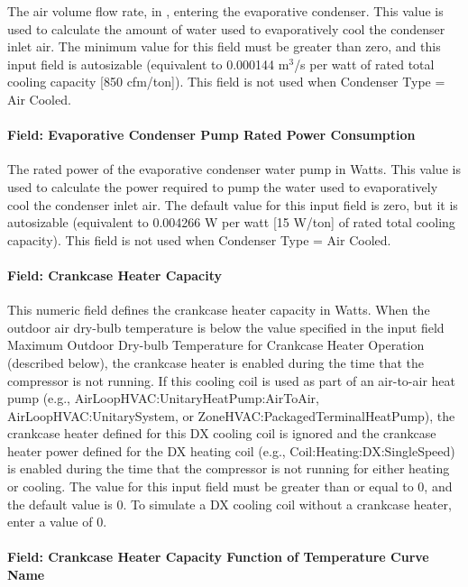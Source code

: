 The air volume flow rate, in \si{\volumeFlowRate}, entering the evaporative condenser. This value is used to calculate the amount of water used to evaporatively cool the condenser inlet air. The minimum value for this field must be greater than zero, and this input field is autosizable (equivalent to 0.000144 m\(^{3}\)/s per watt of rated total cooling capacity {[}850 cfm/ton{]}). This field is not used when Condenser Type = Air Cooled.

\paragraph{Field: Evaporative Condenser Pump Rated Power Consumption}\label{field-evaporative-condenser-pump-rated-power-consumption}

The rated power of the evaporative condenser water pump in Watts. This value is used to calculate the power required to pump the water used to evaporatively cool the condenser inlet air. The default value for this input field is zero, but it is autosizable (equivalent to 0.004266 W per watt {[}15 W/ton{]} of rated total cooling capacity). This field is not used when Condenser Type = Air Cooled.

\paragraph{Field: Crankcase Heater Capacity}\label{field-crankcase-heater-capacity}

This numeric field defines the crankcase heater capacity in Watts. When the outdoor air dry-bulb temperature is below the value specified in the input field Maximum Outdoor Dry-bulb Temperature for Crankcase Heater Operation (described below), the crankcase heater is enabled during the time that the compressor is not running. If this cooling coil is used as part of an air-to-air heat pump (e.g., AirLoopHVAC:UnitaryHeatPump:AirToAir, AirLoopHVAC:UnitarySystem, or ZoneHVAC:PackagedTerminalHeatPump), the crankcase heater defined for this DX cooling coil is ignored and the crankcase heater power defined for the DX heating coil (e.g., Coil:Heating:DX:SingleSpeed) is enabled during the time that the compressor is not running for either heating or cooling. The value for this input field must be greater than or equal to 0, and the default value is 0. To simulate a DX cooling coil without a crankcase heater, enter a value of 0.

\paragraph{Field: Crankcase Heater Capacity Function of Temperature Curve Name}

